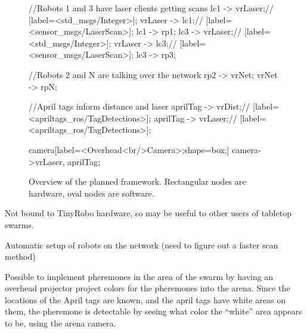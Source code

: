 \documentclass[]{article}
\begin{document}
\begin{figure}[h]
{{		//Robots 1 and 3 have laser clients getting scans
		lc1 -> vrLaser;// [label=<std\string_msgs/Integer>];
		vrLaser -> lc1;// [label=<sensor\string_msgs/LaserScan>];
		lc1 -> rp1;
		lc3 -> vrLaser;// [label=<std\string_msgs/Integer>];
  		vrLaser -> lc3;// [label=<sensor\string_msgs/LaserScan>];
		lc3 -> rp3;
		
		//Robots 2 and N are talking over the network
		rp2 -> vrNet;
		vrNet -> rpN;
					
		//April tags inform distance and laser
		aprilTag -> vrDist;// [label=<apriltags\string_ros/TagDetections>];	
		aprilTag -> vrLaser;// [label=<apriltags\string_ros/TagDetections>];
		
				
	}
	
	camera[label=<Overhead<br/>Camera>;shape=box;]
	camera->{vrLaser, aprilTag};	
		 
	}
	\caption{Overview of the planned framework. Rectangular nodes are hardware, oval nodes are software.}
\end{figure}

Not bound to TinyRobo hardware, so may be useful to other users of tabletop swarms. 

Automatic setup of robots on the network (need to figure out a faster scan method)

Possible to implement pheremones in the area of the swarm by having an overhead projector project colors for the pheremones into the arena. Since the locations of the April tags are known, and the april tags have white areas on them, the pheremone is detectable by seeing what color the ``white'' area appears to be, using the arena camera. 




 



\end{document}
